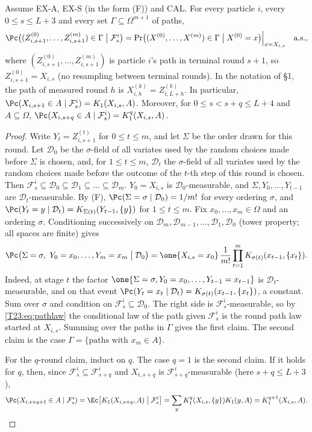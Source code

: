 \documentclass[11pt]{report}
\begin{document}
\begin{T23lemma}\label{T23:lem:markov}
Assume EX-A, EX-S (in the form (F)) and CAL. For every particle $i$, every $0\le s\le L+3$ and every set $\Gamma\subseteq\Omega^{m+1}$ of paths,
\[
\Pc\bigl((Z^{(0)}_{i,s+1},\dots,Z^{(m)}_{i,s+1})\in\Gamma\bigm|\mathcal F^i_s\bigr)=\Pr\bigl((X^{(0)},\dots,X^{(m)})\in\Gamma\bigm|X^{(0)}=x\bigr)\Big|_{x=X_{i,s}}\quad\text{a.s.},
\]
where $(Z^{(0)}_{i,s+1},\dots,Z^{(m)}_{i,s+1})$ is particle $i$'s path in terminal round $s+1$, so $Z^{(0)}_{i,s+1}=X_{i,s}$ (no resampling between terminal rounds). In the notation of \S1, the path of measured round $h$ is $X^{(k)}_{i,h}=Z^{(k)}_{i,L+h}$. In particular, $\Pc(X_{i,s+1}\in A\mid\mathcal F^i_s)=K_1(X_{i,s},A)$. Moreover, for $0\le s<s+q\le L+4$ and $A\subseteq\Omega$, $\Pc(X_{i,s+q}\in A\mid\mathcal F^i_s)=K_1^{q}(X_{i,s},A)$.
\end{T23lemma}

\begin{proof}
Write $Y_t=Z^{(t)}_{i,s+1}$ for $0\le t\le m$, and let $\Sigma$ be the order drawn for this round. Let $\mathcal D_0$ be the $\sigma$-field of all variates used by the random choices made before $\Sigma$ is chosen, and, for $1\le t\le m$, $\mathcal D_t$ the $\sigma$-field of all variates used by the random choices made before the outcome of the $t$-th step of this round is chosen. Then $\mathcal F^i_s\subseteq\mathcal D_0\subseteq\mathcal D_1\subseteq\dots\subseteq\mathcal D_m$. $Y_0=X_{i,s}$ is $\mathcal D_0$-measurable, and $\Sigma,Y_0,\dots,Y_{t-1}$ are $\mathcal D_t$-measurable. By (F), $\Pc(\Sigma=\sigma\mid\mathcal D_0)=1/m!$ for every ordering $\sigma$, and $\Pc(Y_t=y\mid\mathcal D_t)=K_{\Sigma(t)}(Y_{t-1},\{y\})$ for $1\le t\le m$. Fix $x_0,\dots,x_m\in\Omega$ and an ordering $\sigma$. Conditioning successively on $\mathcal D_m,\mathcal D_{m-1},\dots,\mathcal D_1,\mathcal D_0$ (tower property; all spaces are finite) gives
\[
\Pc\bigl(\Sigma=\sigma,\ Y_0=x_0,\dots,Y_m=x_m\bigm|\mathcal D_0\bigr)=\one\{X_{i,s}=x_0\}\,\frac1{m!}\prod_{t=1}^mK_{\sigma(t)}(x_{t-1},\{x_t\}).
\]
Indeed, at stage $t$ the factor $\one\{\Sigma=\sigma,Y_0=x_0,\dots,Y_{t-1}=x_{t-1}\}$ is $\mathcal D_t$-measurable, and on that event $\Pc(Y_t=x_t\mid\mathcal D_t)=K_{\sigma(t)}(x_{t-1},\{x_t\})$, a constant. Sum over $\sigma$ and condition on $\mathcal F^i_s\subseteq\mathcal D_0$. The right side is $\mathcal F^i_s$-measurable, so by \eqref{T23:eq:pathlaw} the conditional law of the path given $\mathcal F^i_s$ is the round path law started at $X_{i,s}$. Summing over the paths in $\Gamma$ gives the first claim. The second claim is the case $\Gamma=\{\text{paths with }x_m\in A\}$.

For the $q$-round claim, induct on $q$. The case $q=1$ is the second claim. If it holds for $q$, then, since $\mathcal F^i_s\subseteq\mathcal F^i_{s+q}$ and $X_{i,s+q}$ is $\mathcal F^i_{s+q}$-measurable (here $s+q\le L+3$),
\[
\Pc(X_{i,s+q+1}\in A\mid\mathcal F^i_s)=\Ec\bigl[K_1(X_{i,s+q},A)\bigm|\mathcal F^i_s\bigr]=\sum_{y}K_1^{q}(X_{i,s},\{y\})K_1(y,A)=K_1^{q+1}(X_{i,s},A).\qedhere
\]
\end{proof}
\end{document}
